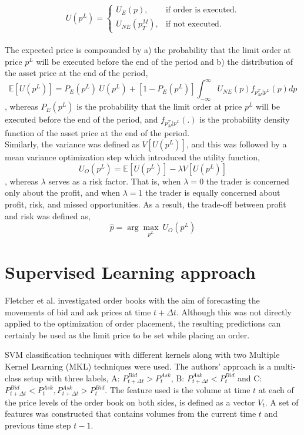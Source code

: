 \begin{equation}
    U(p^L) = \begin{cases}
                U_E(p), & \text{if order is executed}.\\
                U_{NE}(p_T^M), & \text{if not executed}.
             \end{cases}
\end{equation}
\hfill
\\
The expected price is compounded by a) the probability that the limit order at price $p^L$ will be executed before the end of the period and b) the distribution of the asset price at the end of the period,
\begin{equation}
    \mathbb{E}[U(p^L)] = P_E(p^L)\ U(p^L) + [1-P_E(p^L)] \int_{-\infty}^{\infty} U_{NE}(p) f_{p_M^T | p^L}(p) dp
\end{equation}
, whereas $P_E(p^L)$ is the probability that the limit order at price $p^L$ will be executed before the end of the period, and $f_{p_M^T | p^L}(.)$ is the probability density function of the asset price at the end of the period. 
\\
Similarly, the variance was defined as $V[U(p^L)]$, and this was followed by a mean variance optimization step which introduced the utility function,
\begin{equation}
    U_O(p^L) = \mathbb{E}[U(p^L)] - \lambda V[U(p^L)]
\end{equation}
, whereas $\lambda$ serves as a risk factor.
That is, when $\lambda=0$ the trader is concerned only about the profit, and when $\lambda=1$ the trader is equally concerned about profit, risk, and missed opportunities.
As a result, the trade-off between profit and risk was defined as,
\begin{equation}
    \hat{p} = \arg\max_{p^L}\ U_O(p^L)
\end{equation}


\section{Supervised Learning approach}

Fletcher et al. \cite{fletcher2010multiple} investigated order books with the aim of forecasting the movements of bid and ask prices at time $t+\Delta{t}$.
Although this was not directly applied to the optimization of order placement, the resulting predictions can certainly be used as the limit price to be set while placing an order.

SVM classification techniques with different kernels along with two Multiple Kernel Learning (MKL) techniques were used.
The authors' approach is a multi-class setup with three labels, A: $P_{t+\Delta{t}}^{Bid} > P_t^{Ask}$, B: $P_{t+\Delta{t}}^{Ask} < P_t^{Bid}$ and C: $P_{t+\Delta{t}}^{Bid} < P_t^{Ask}, P_{t+\Delta{t}}^{Ask} > P_t^{Bid}$.
The feature used is the volume at time $t$ at each of the price levels of the order book on both sides, is defined as a vector $V_t$.
A set of features was constructed that contains volumes from the current time $t$ and previous time step $t-1$.


